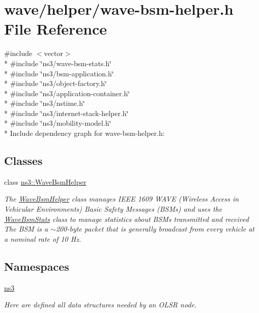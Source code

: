 \hypertarget{wave-bsm-helper_8h}{}\section{wave/helper/wave-\/bsm-\/helper.h File Reference}
\label{wave-bsm-helper_8h}
{\ttfamily \#include $<$vector$>$}\\*
{\ttfamily \#include \char`\"{}ns3/wave-\/bsm-\/stats.\+h\char`\"{}}\\*
{\ttfamily \#include \char`\"{}ns3/bsm-\/application.\+h\char`\"{}}\\*
{\ttfamily \#include \char`\"{}ns3/object-\/factory.\+h\char`\"{}}\\*
{\ttfamily \#include \char`\"{}ns3/application-\/container.\+h\char`\"{}}\\*
{\ttfamily \#include \char`\"{}ns3/nstime.\+h\char`\"{}}\\*
{\ttfamily \#include \char`\"{}ns3/internet-\/stack-\/helper.\+h\char`\"{}}\\*
{\ttfamily \#include \char`\"{}ns3/mobility-\/model.\+h\char`\"{}}\\*
Include dependency graph for wave-\/bsm-\/helper.h\+:
\subsection*{Classes}
\begin{DoxyCompactItemize}
\item 
class \hyperlink{classns3_1_1WaveBsmHelper}{ns3\+::\+Wave\+Bsm\+Helper}
\begin{DoxyCompactList}\small\item\em The \hyperlink{classns3_1_1WaveBsmHelper}{Wave\+Bsm\+Helper} class manages I\+E\+EE 1609 W\+A\+VE (Wireless Access in Vehicular Environments) Basic Safety Messages (B\+S\+Ms) and uses the \hyperlink{classns3_1_1WaveBsmStats}{Wave\+Bsm\+Stats} class to manage statistics about B\+S\+Ms transmitted and received The B\+SM is a $\sim$200-\/byte packet that is generally broadcast from every vehicle at a nominal rate of 10 Hz. \end{DoxyCompactList}\end{DoxyCompactItemize}
\subsection*{Namespaces}
\begin{DoxyCompactItemize}
\item 
 \hyperlink{namespacens3}{ns3}
\begin{DoxyCompactList}\small\item\em Here are defined all data structures needed by an O\+L\+SR node. \end{DoxyCompactList}\end{DoxyCompactItemize}
